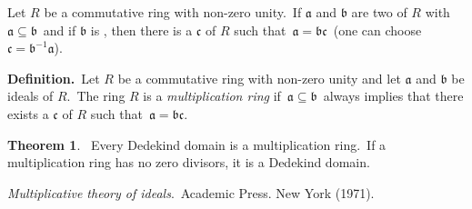 \documentclass[12pt]{article}
\theoremstyle{definition}
\newtheorem*{thmplain}{Theorem}
\begin{document}
Let $R$ be a commutative ring with non-zero unity.\, If $\mathfrak{a}$ and $\mathfrak{b}$ are two  of $R$ with\, $\mathfrak{a} \subseteq \mathfrak{b}$\, and if $\mathfrak{b}$ is , then there is a  $\mathfrak{c}$ of $R$ such that\, $\mathfrak{a} = \mathfrak{bc}$\, (one can choose\, $\mathfrak{c} = \mathfrak{b}^{-1}\mathfrak{a}$).

\textbf{Definition.}\, Let $R$ be a commutative ring with non-zero unity and let $\mathfrak{a}$ and $\mathfrak{b}$ be ideals of $R$.\, The ring $R$ is a {\em multiplication ring} if\, $\mathfrak{a} \subseteq \mathfrak{b}$\, always implies that there exists a  $\mathfrak{c}$ of $R$ such that\, $\mathfrak{a} = \mathfrak{bc}$.

\begin{thmplain}
 \, Every Dedekind domain is a multiplication ring.\, If a multiplication ring has no zero divisors, it is a Dedekind domain.
\end{thmplain}

\begin{thebibliography}{9}
 {\em Multiplicative theory of ideals}.\, Academic Press. New York (1971).
\end{thebibliography}
\end{document}
